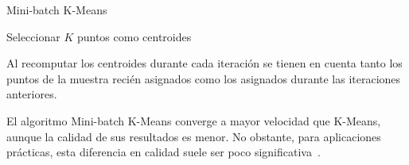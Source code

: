 \begin{algorithm}
    \caption{Mini-batch K-Means}
    \label{algorithm:MiniBatchKMeans}
    Seleccionar $K$ puntos como centroides\;
\end{algorithm}

Al recomputar los centroides durante cada iteración se tienen en cuenta tanto los puntos de la muestra recién asignados como los asignados durante las iteraciones anteriores.

El algoritmo Mini-batch K-Means converge a mayor velocidad que K-Means,
aunque la calidad de sus resultados es menor.
No obstante, para aplicaciones prácticas, esta diferencia en calidad suele ser poco significativa~\cite{Sculley10}.